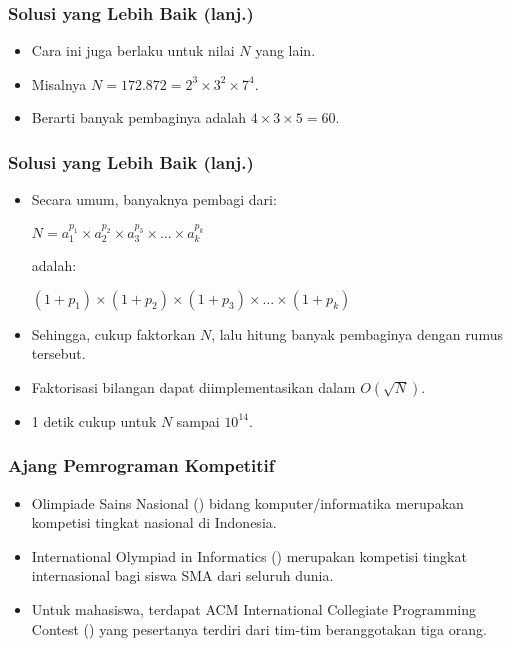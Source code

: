 \begin{frame}
\frametitle{Solusi yang Lebih Baik (lanj.)}
\begin{itemize}
  \item Cara ini juga berlaku untuk nilai $N$ yang lain.
  \item Misalnya $N = 172.872 = 2^3 \times 3^2 \times 7^4$.
  \item Berarti banyak pembaginya adalah $4 \times 3 \times 5 = 60$.
\end{itemize}
\end{frame}

\begin{frame}
\frametitle{Solusi yang Lebih Baik (lanj.)}
\begin{itemize}
  \item Secara umum, banyaknya pembagi dari:
  \newline
  \begin{center}
    $N = a_1^{p_1} \times a_2^{p_2} \times a_3^{p_3} \times ... \times a_k^{p_k}$
  \end{center}
  adalah:
  \newline
  \begin{center}
    $(1+p_1) \times (1+p_2) \times (1+p_3) \times ... \times (1+p_k)$
    \newline
  \end{center}
  \item Sehingga, cukup faktorkan $N$, lalu hitung banyak pembaginya dengan rumus tersebut.
  \item Faktorisasi bilangan dapat diimplementasikan dalam $O(\sqrt{N})$.
  \item 1 detik cukup untuk $N$ sampai $10^{14}$.
\end{itemize}
\end{frame}

\begin{frame}
\frametitle{Ajang Pemrograman Kompetitif}
\begin{itemize}
  \item Olimpiade Sains Nasional () bidang komputer/informatika merupakan kompetisi tingkat nasional di Indonesia.
  \item International Olympiad in Informatics () merupakan kompetisi tingkat internasional bagi siswa SMA dari seluruh dunia.
  \item Untuk mahasiswa, terdapat ACM International Collegiate Programming Contest () yang pesertanya terdiri dari tim-tim beranggotakan tiga orang.
\end{itemize}
\end{frame}

